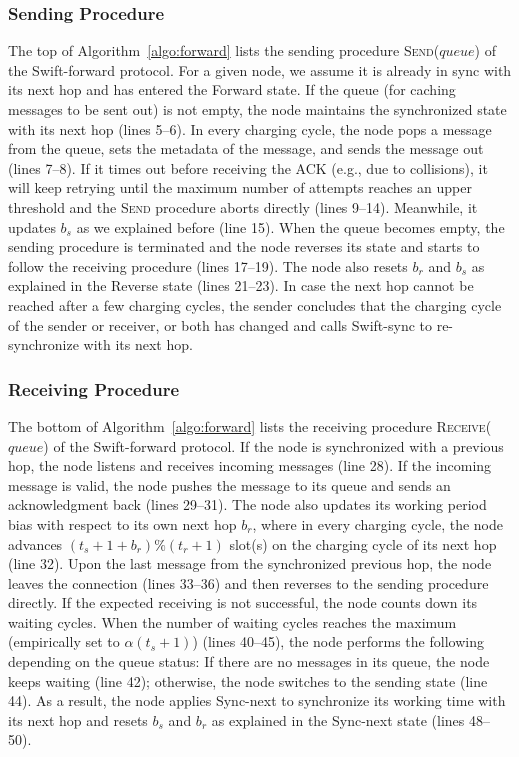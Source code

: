 \documentclass[lettersize,journal]{IEEEtran}
\newcommand{\ours}{Swift\xspace}
\newcommand{\sync}{Swift-sync\xspace}
\begin{document}
\subsubsection{Sending Procedure} 
The top of Algorithm~\ref{algo:forward} lists the sending procedure \textsc{Send($queue$)} of the \ours-forward protocol. For a given node, we assume it is already in sync with its next hop and has entered the Forward state. If the queue (for caching messages to be sent out) is not empty, the node maintains the synchronized state with its next hop (lines 5--6). In every charging cycle, the node pops a message from the queue, sets the metadata of the message, and sends the message out (lines 7--8). If it times out before receiving the ACK (e.g., due to collisions), it will keep retrying until the maximum number of attempts reaches an upper threshold and the \textsc{Send} procedure aborts directly (lines 9--14). Meanwhile, it updates $b_s$ as we explained before (line 15). When the queue becomes empty, the sending procedure is terminated and the node reverses its state and starts to follow the receiving procedure (lines 17--19). The node also resets $b_r$ and $b_s$ as explained in the Reverse state (lines 21--23). In case the next hop cannot be reached after a few charging cycles, the sender concludes that the charging cycle of the sender or receiver, or both has changed and calls \sync to re-synchronize with its next hop.

\subsubsection{Receiving Procedure}
The bottom of Algorithm~\ref{algo:forward} lists the receiving procedure \textsc{Receive($queue$)} of the \ours-forward protocol. If the node is synchronized with a previous hop, the node listens and receives incoming messages (line 28). If the incoming message is valid, the node pushes the message to its queue and sends an acknowledgment back (lines 29--31). The node also updates its working period bias with respect to its own next hop $b_r$, where in every charging cycle, the node advances $(t_s + 1 + b_r)\%(t_r + 1)$ slot(s) on the charging cycle of its next hop (line 32). Upon the last message from the synchronized previous hop, the node leaves the connection (lines 33--36) and then reverses to the sending procedure directly. If the expected receiving is not successful, the node counts down its waiting cycles. When the number of waiting cycles reaches the maximum (empirically set to $\alpha(t_s + 1)$) (lines 40--45), the node performs the following depending on the queue status: If there are no messages in its queue, the node keeps waiting (line 42); otherwise, the node switches to the sending state (line 44). As a result, the node applies Sync-next to synchronize its working time with its next hop and resets $b_s$ and $b_r$ as explained in the Sync-next state (lines 48--50).
\end{document}
